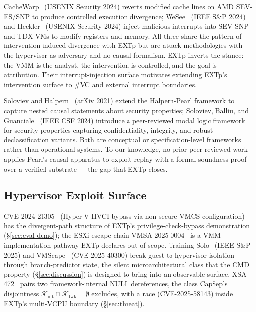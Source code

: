 \documentclass[conference]{IEEEtran}
\newcommand{\Kint}{\mathcal{K}_\text{int}}
\newcommand{\Kfwk}{\mathcal{K}_\text{fwk}}
\begin{document}
CacheWarp~\cite{zhang2024cachewarp} (USENIX Security 2024) reverts
modified cache lines on AMD SEV-ES/SNP to produce controlled
execution divergence; WeSee~\cite{schlueter2024wesee} (IEEE S\&P
2024) and Heckler~\cite{schlueter2024heckler} (USENIX Security 2024)
inject malicious interrupts into SEV-SNP and TDX VMs to modify
registers and memory. All three share the pattern of
intervention-induced divergence with EXTp but are attack
methodologies with the hypervisor as adversary and no causal
formalism. EXTp inverts the stance: the VMM is the analyst, the
intervention is controlled, and the goal is attribution. Their
interrupt-injection surface motivates extending EXTp's intervention
surface to \#VC and external interrupt boundaries.

Soloviev and Halpern~\cite{soloviev2021nested} (arXiv 2021) extend
the Halpern-Pearl framework to capture nested causal statements
about security properties; Soloviev, Balliu, and
Guanciale~\cite{soloviev2024modal} (IEEE CSF 2024) introduce a
peer-reviewed modal logic framework for security properties
capturing confidentiality, integrity, and robust declassification
variants. Both are conceptual or specification-level frameworks
rather than operational systems. To our knowledge, no prior
peer-reviewed work applies Pearl's causal apparatus to exploit
replay with a formal soundness proof over a verified substrate ---
the gap that EXTp closes.

\subsection{Hypervisor Exploit Surface}

CVE-2024-21305~\cite{tandasat2024hvci} (Hyper-V HVCI bypass via
non-secure VMCS configuration) has the divergent-path structure of
EXTp's privilege-check-bypass demonstration (\S\ref{sec:eval-demo});
the ESXi escape chain VMSA-2025-0004~\cite{broadcom2025vmsa} is a
VMM-implementation pathway EXTp declares out of scope. Training
Solo~\cite{barberis2025trainingsolo} (IEEE S\&P 2025) and
VMScape~\cite{vmscape2025} (CVE-2025-40300) break guest-to-hypervisor
isolation through branch-predictor state, the silent
microarchitectural class that the CMD property
(\S\ref{sec:discussion}) is designed to bring into an observable
surface. XSA-472~\cite{xsa472} pairs two framework-internal
NULL dereferences, the class CapSep's disjointness
$\Kint \cap \Kfwk = \emptyset$ excludes, with a race
(CVE-2025-58143) inside EXTp's multi-VCPU boundary
(\S\ref{sec:threat}).
\end{document}
